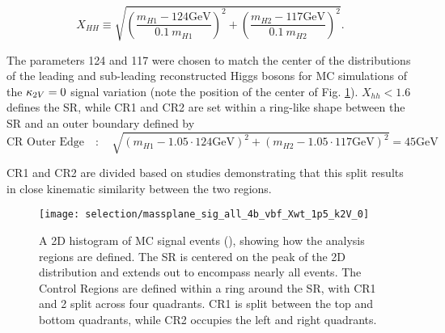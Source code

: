         \begin{equation}
            X_{HH} \equiv \sqrt{\left(\frac{m_{H1} - 124\textrm{GeV}}{0.1 \ m_{H1}}\right)^{2}
                + \left(\frac{m_{H2} - 117\textrm{GeV}}{0.1 \ m_{H2}}\right)^{2}}.
            \label{eq:xhh}
        \end{equation}

        The \mhh parameters 124 and 117 were chosen to match the center of the \mhh distributions
            of the leading and sub-leading reconstructed Higgs bosons for
            MC simulations of the $\kappa_{2V} = 0$ signal variation
            (note the position of the center of Fig. \ref{fig:region_definition}).
        $X_{hh} < 1.6$ defines the SR,
            while CR1 and CR2 are set within a ring-like shape between the SR
            and an outer boundary defined by
        \begin{equation}
            \text{CR\ Outer\ Edge} \quad : \quad \sqrt{ \left(m_{H1} - 1.05 \cdot 124\textrm{GeV}\right)^2
                +  \left(m_{H2} - 1.05 \cdot 117\textrm{GeV}\right)^2 } = 45\textrm{GeV}
            \label{eq:cr_out}
        \end{equation}
        
        CR1 and CR2 are divided based on studies demonstrating that this split results in
            close kinematic similarity between the two regions.

        \begin{figure}[tbh]
            \texttt{[image: selection/massplane\_sig\_all\_4b\_vbf\_Xwt\_1p5\_k2V\_0]}
            \caption{
                A 2D histogram of MC signal events (), showing how the analysis regions are defined.
                The SR is centered on the peak of the 2D distribution and extends out to encompass nearly all events.
                The Control Regions are defined within a ring around the SR,
                    with CR1 and 2 split across four quadrants.
                CR1 is split between the top and bottom quadrants,
                    while CR2 occupies the left and right quadrants.
                \cite{hh4b_2021_int_note}
            }
            \label{fig:region_definition}
        \end{figure}

